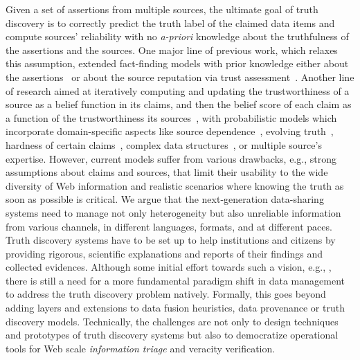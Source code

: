 \documentclass[prodmode,acmtecs]{acmsmall} %
\begin{document}
Given a set of assertions from multiple sources, the ultimate goal of truth discovery is to correctly predict the truth label of the claimed
data items and compute sources' reliability with no \emph{a-priori} knowledge about the truthfulness of the assertions and the sources. One 
major line of previous work, which relaxes this assumption, extended fact-finding models with prior knowledge either about the assertions~\cite{PasternackR13} 
or about the source reputation via trust assessment~\cite{BalakrishnanK11}. Another line of research aimed at iteratively computing and updating the trustworthiness
of a source as a belief function in its claims, and then the belief score of each claim as a function of the trustworthiness its sources~\cite{YinHY08}, with 
probabilistic models which incorporate domain-specific aspects like source dependence~\cite{DongBHS10a}, evolving truth~\cite{DongBS09a}, hardness of certain 
claims~\cite{GallandAMS10}, complex data structures~\cite{ZhaoRGH12,GoasdoueKKLMZ13}, or multiple source's expertise. However, current models suffer from various 
drawbacks, e.g., strong assumptions about claims and sources, that 
limit their usability to the wide diversity of Web information and realistic scenarios where knowing the truth as soon as possible 
is critical. 
 We argue that the next-generation data-sharing systems need to manage not only heterogeneity but also unreliable 
 information from various channels, in different languages, formats, and at different paces. Truth discovery systems 
 have to be set up to help institutions and citizens by providing rigorous, scientific explanations and reports 
 of their findings and collected evidences. Although some initial effort towards such a vision,
 e.g., \cite{DongS2013,DongBHS10a,LiDLMS12}, there is still a need for a more fundamental paradigm shift in data
 management to address the truth discovery problem natively. Formally, this goes beyond adding layers and extensions to
 data fusion heuristics, data provenance or truth discovery models. Technically, the challenges are not only to  design 
 techniques and prototypes of truth discovery systems but also to democratize operational tools for Web scale \emph{information
 triage} and veracity verification.
  
  
  

 
\end{document}
